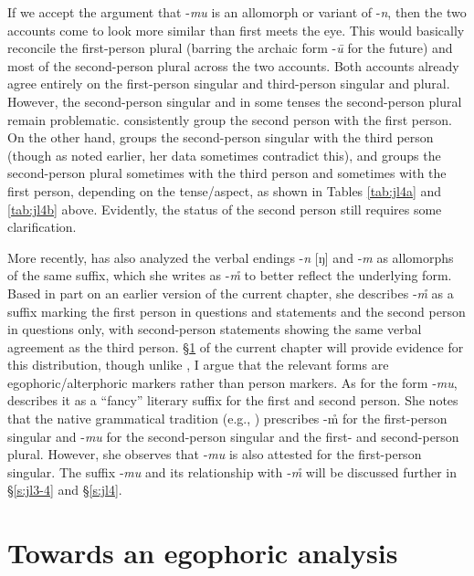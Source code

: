\documentclass[output=paper]{langsci/langscibook}
\begin{document}
 If we accept the argument that -\textit{mu} is an allomorph or variant of -\textit{n}, then the two accounts come to look more similar than first meets the eye. This would basically reconcile the first-person plural (barring the archaic form -\textit{ū} for the future) and most of the second-person plural across the two accounts. Both accounts already agree entirely on the first-person singular and third-person singular and plural. However, the second-person singular and in some tenses the second-person plural remain problematic. \cite{CainGair2000} consistently group the second person with the first person. On the other hand, \cite{Fritz2002} groups the second-person singular with the third person (though as noted earlier, her data sometimes contradict this), and groups the second-person plural sometimes with the third person and sometimes with the first person, depending on the tense/aspect, as shown in Tables \ref{tab:jl4a} and \ref{tab:jl4b} above. Evidently, the status of the second person still requires some clarification. 

 More recently, \cite[138–140]{Gnanadesikan2017} has also analyzed the verbal endings -\textit{n} [ŋ] and ‑\textit{m} as allomorphs of the same suffix, which she writes as -\textit{m̊} to better reflect the underlying form. Based in part on an earlier version of the current chapter, she describes ‑\textit{m̊} as a suffix marking the first person in questions and statements and the second person in questions only, with second-person statements showing the same verbal agreement as the third person. §\ref{s:jl3} of the current chapter will provide evidence for this distribution, though unlike \citeauthor{Gnanadesikan2017}, I argue that the relevant forms are egophoric/alterphoric markers rather than person markers. As for the form ‑\textit{mu}, \cite[138–140]{Gnanadesikan2017} describes it as a “fancy” literary suffix for the first and second person. She notes that the native grammatical tradition (e.g., \citealt{Ahmad1970}) prescribes -m̊ for the first-person singular and -\textit{mu} for the second-person singular and the first- and second-person plural. However, she observes that ‑\textit{mu} is also attested for the first-person singular. The suffix ‑\textit{mu} and its relationship with ‑\textit{m̊} will be discussed further in §‎\ref{s:jl3-4} and §\ref{s:jl4}.

\section{Towards an egophoric analysis}\label{s:jl3}
\end{document}
